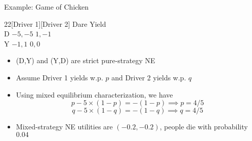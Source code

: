 \documentclass[11pt,aspectratio=169,handout]{beamer}
\begin{document}
  \begin{frame}{Example: Game of Chicken}
   \begin{center}
    \hspace{-9.8em}
    \begin{game}{2}{2}[Driver 1][Driver 2]
     	\> Dare		\> Yield			\\
     D	\> $-5, -5$	\> $ 1, -1$		\\
     Y	\> $-1,  1$	\> $ 0,  0$
    \end{game}
   \end{center}
   \begin{itemize}[<+->]
    \item (D,Y) and (Y,D) are \alert{strict} pure-strategy NE
    \item Assume Driver 1 yields w.p. $p$ and Driver 2 yields w.p. $q$
    \item Using mixed equilibrium characterization, we have 
	$$ p - 5\times (1 - p) = - (1 - p) \implies p = 4/5 $$
    $$ q - 5\times (1 - q) = - (1 - q) \implies q = 4/5 $$
    \item Mixed-strategy NE utilities are $(-0.2, -0.2)$, people \alert{die} with probability $0.04$
   \end{itemize}
  \end{frame}
\end{document}
